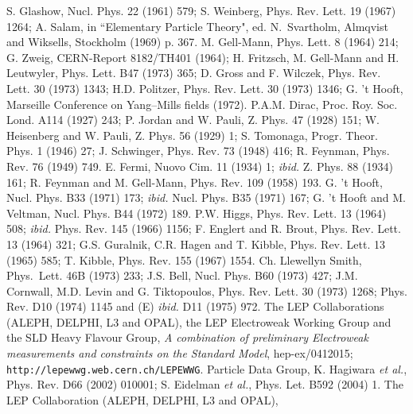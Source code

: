 \begin{thebibliography}{999}
S. Glashow, Nucl. Phys. 22 (1961) 579;
S. Weinberg, Phys. Rev. Lett. 19 (1967) 1264;
A. Salam, in ``Elementary Particle Theory", ed. N.~Svartholm, Almqvist and 
Wiksells, Stockholm (1969) p. 367.
%
 M. Gell-Mann, Phys. Lett. 8 (1964) 214;
G. Zweig, CERN-Report 8182/TH401 (1964); 
H. Fritzsch, M. Gell-Mann and H. Leutwyler, Phys. Lett. B47 (1973) 365;
D. Gross and F. Wilczek, Phys. Rev. Lett. 30 (1973) 1343; 
H.D. Politzer, Phys. Rev. Lett. 30 (1973) 1346; 
G. 't Hooft, Marseille Conference on Yang--Mills fields (1972). 
%
 P.A.M. Dirac, Proc. Roy. Soc. Lond. A114 (1927) 243;
P. Jordan and W. Pauli, Z. Phys. 47 (1928) 151;
W. Heisenberg and W. Pauli, Z. Phys. 56 (1929) 1; 
S. Tomonaga,  Progr. Theor. Phys.  1 (1946) 27;
J. Schwinger, Phys. Rev.  73 (1948) 416;
R. Feynman, Phys. Rev. 76 (1949) 749.
%
 E. Fermi, Nuovo Cim. 11 (1934) 1; {\it ibid.} Z. Phys. 88 (1934)
161; R. Feynman and M. Gell-Mann, Phys. Rev. 109 (1958) 193. 
%
 G. 't Hooft, Nucl. Phys. B33 (1971) 173; {\it ibid.} Nucl. 
Phys. B35 (1971) 167; G. 't Hooft and M. Veltman, Nucl. Phys. B44 (1972) 189.
%
 P.W. Higgs, Phys. Rev. Lett. 13  (1964) 508; {\it ibid.} 
Phys. Rev. 145 (1966) 1156; 
F. Englert and R. Brout, Phys. Rev. Lett. 13 (1964) 321; 
G.S. Guralnik, C.R. Hagen and T. Kibble, Phys. Rev. Lett. 13 (1965) 585;
T. Kibble, Phys. Rev. 155 (1967) 1554.
%
 Ch. Llewellyn Smith, Phys.\ Lett. 46B (1973) 233;
J.S. Bell, Nucl. Phys. B60 (1973) 427; 
J.M. Cornwall, M.D. Levin and G. Tiktopoulos, Phys. Rev. Lett.  30 (1973)
1268; \ib Phys. Rev. D10 (1974) 1145 and (E) {\it ibid.} D11 
(1975) 972. 
%
 The LEP Collaborations (ALEPH, DELPHI, L3 and OPAL), 
the LEP Electroweak Working Group and the SLD Heavy Flavour Group, {\it A
combination of preliminary Electroweak measurements and constraints on the
Standard Model}, hep-ex/0412015; {\tt http://lepewwg.web.cern.ch/LEPEWWG}. 
%
 Particle Data Group, K. Hagiwara {\it et al.}, Phys. Rev. D66 
(2002) 010001; S. Eidelman {\it et al.}, Phys. Let. B592 (2004) 1. 
%
 The LEP Collaboration (ALEPH, DELPHI, L3 and OPAL), 

\end{thebibliography}
